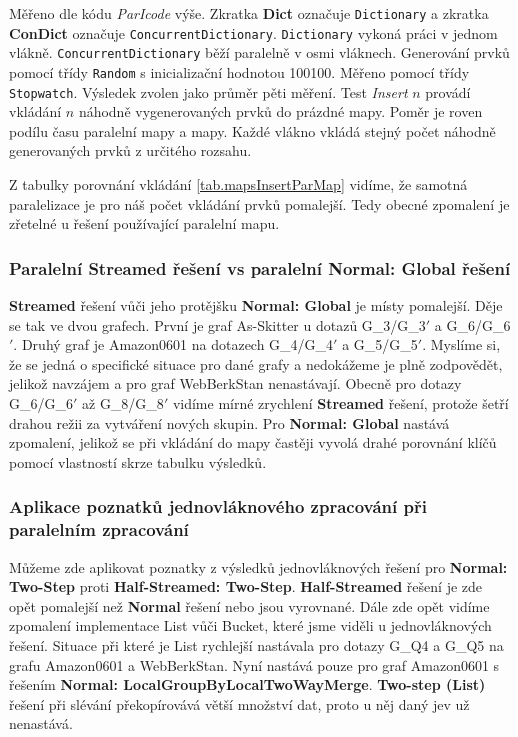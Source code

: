 Měřeno dle kódu \textit{ParIcode} výše. 
Zkratka \textbf{Dict} označuje \texttt{Dictionary} a zkratka \textbf{ConDict} označuje \texttt{ConcurrentDictionary}. 
\texttt{Dictionary} vykoná práci v jednom vlákně. 
\texttt{ConcurrentDictionary} běží paralelně v osmi vláknech. 
Generování prvků pomocí třídy \texttt{Random} s inicializační hodnotou 100100. 
Měřeno pomocí třídy \texttt{Stopwatch}. 
Výsledek zvolen jako průměr pěti měření. 
Test \textit{Insert} $n$ provádí vkládání $n$ náhodně vygenerovaných prvků do prázdné mapy. 
Poměr je roven podílu času paralelní mapy a mapy. Každé vlákno vkládá stejný počet náhodně generovaných prvků z určitého rozsahu.

Z tabulky porovnání vkládání \ref{tab.mapsInsertParMap} vidíme, že samotná paralelizace je pro náš počet vkládání prvků pomalejší. 
Tedy obecné zpomalení je zřetelné u řešení používající paralelní mapu.

\subsubsection{Paralelní Streamed řešení vs paralelní Normal: Global řešení}

\textbf{Streamed} řešení vůči jeho protějšku \textbf{Normal: Global} je místy pomalejší. 
Děje se tak ve dvou grafech.
První je graf As-Skitter u dotazů  G\_3/G\_3$'$ a  G\_6/G\_6$'$.
Druhý graf je Amazon0601 na dotazech G\_4/G\_4$'$ a  G\_5/G\_5$'$.
Myslíme si, že se jedná o specifické situace pro dané grafy a nedokážeme je plně zodpovědět, jelikož navzájem a pro graf WebBerkStan nenastávají.
Obecně pro dotazy G\_6/G\_6$'$ až G\_8/G\_8$'$ vidíme mírné zrychlení \textbf{Streamed} řešení, protože šetří drahou režii za vytváření nových skupin.
Pro \textbf{Normal: Global} nastává zpomalení, jelikož se při vkládání do mapy častěji vyvolá drahé porovnání klíčů pomocí vlastností skrze tabulku výsledků. 

\subsubsection{Aplikace poznatků jednovláknového zpracování při paralelním zpracování}

Můžeme zde aplikovat poznatky z výsledků jednovláknových řešení pro \textbf{Normal: Two-Step} proti \textbf{Half-Streamed: Two-Step}.
\textbf{Half-Streamed} řešení je zde opět pomalejší než \textbf{Normal} řešení nebo jsou vyrovnané.
Dále zde opět vidíme zpomalení implementace List vůči Bucket, které jsme viděli u jednovláknových řešení.
Situace při které je List rychlejší nastávala pro dotazy G\_Q4 a G\_Q5 na grafu Amazon0601 a WebBerkStan.
Nyní nastává pouze pro graf Amazon0601 s řešením \textbf{Normal: LocalGroupByLocalTwoWayMerge}.
\textbf{Two-step (List)} řešení při slévání překopírovává větší množství dat, proto u něj daný jev už nenastává. 


